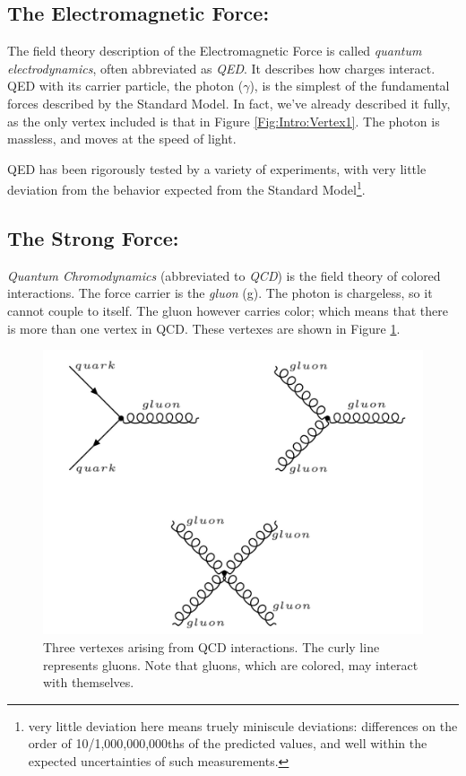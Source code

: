 \subsection{The Electromagnetic Force:}
The field theory description of the Electromagnetic Force is called \textit{quantum electrodynamics}, often abbreviated as \textit{QED}. It describes how charges interact. QED with its carrier particle, the photon ($\gamma$), is the simplest of the fundamental forces described by the Standard Model. In fact, we've already described it fully, as the only vertex included is that in Figure \ref{Fig:Intro:Vertex1}. The photon is massless, and moves at the speed of light. 

QED has been rigorously tested by a variety of experiments, with very little deviation from the behavior expected from the Standard Model\footnote{very little deviation here means truely miniscule deviations: differences on the order of 10/1,000,000,000ths of the predicted values, and well within the expected uncertainties of such measurements.}. 

\subsection{The Strong Force:}
\textit{Quantum Chromodynamics} (abbreviated to \textit{QCD}) is the field theory of colored interactions. The force carrier is the \textit{gluon} (g). The photon is chargeless, so it cannot couple to itself. The gluon however carries color; which means that there is more than one vertex in QCD. These vertexes are shown in Figure \ref{Fig:Intro:Vertex2}.
\begin{figure}[h]
    \centering
        \includegraphics[width=\textwidth]{F1/Vertex2}
        \caption{Three vertexes arising from QCD interactions. The curly line represents gluons. Note that gluons, which are colored, may interact with themselves.}
        \label{Fig:Intro:Vertex2}
\end{figure}

